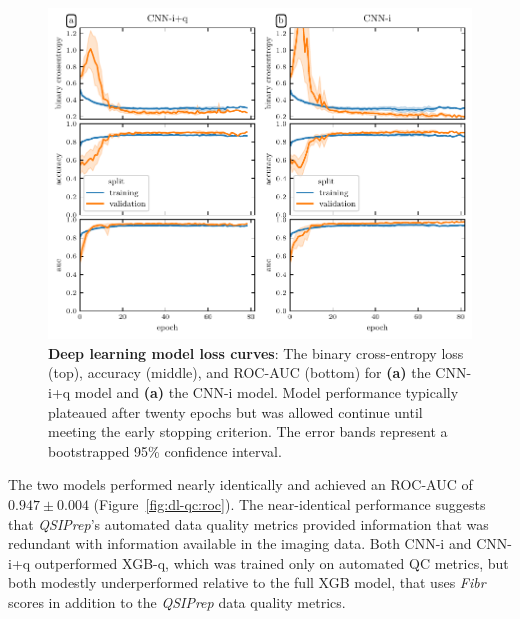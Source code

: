 \documentclass[fleqn,10pt,inline]{wlscirep}
\begin{document}
\begin{figure}[tbp]
    \centering
    \includegraphics[width=\linewidth]{dl_learning_curves.pdf}
    \caption[Deep learning model loss curves]{%
        {\bf Deep learning model loss curves}:
        The binary cross-entropy loss (top), accuracy (middle), and ROC-AUC
        (bottom) for \textbf{(a)} the CNN-i+q model and \textbf{(a)} the CNN-i
        model. Model performance typically plateaued after twenty epochs but was
        allowed continue until meeting the early stopping criterion. The error
        bands represent a bootstrapped 95\% confidence interval.
    }
    \label{fig:dl-loss}
\end{figure}

The two models performed nearly identically and achieved an ROC-AUC of $0.947 \pm 0.004$ (Figure~\ref{fig:dl-qc:roc}). The
near-identical performance suggests that \emph{QSIPrep}'s automated data quality metrics
provided information that was redundant with information available in the imaging
data. Both CNN-i and CNN-i+q outperformed XGB-q, which was trained only on
automated QC metrics, but both modestly underperformed relative to the full XGB model,
that uses \emph{Fibr} scores in addition to the \emph{QSIPrep} data quality metrics.
\end{document}
